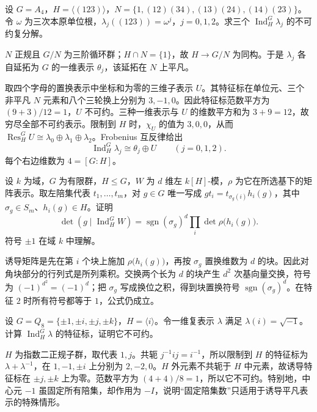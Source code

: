\begin{exercise}\label{b5:ex:03-a4-induction}
	设 \(G=A_4\)，\(H=\bigl\langle(123)\bigr\rangle\)，\(N=\bigl\{1,(12)(34),(13)(24),(14)(23)\bigr\}\)。令 \(\omega\) 为三次本原单位根，\(\lambda_j((123))=\omega^j\)，\(j=0,1,2\)。求三个 \(\operatorname{Ind}_H^G\lambda_j\) 的不可约复分解。
\end{exercise}
\begin{solution}
	\(N\) 正规且 \(G/N\) 为三阶循环群；\(H\cap N=\{1\}\)，故 \(H\rightarrow G/N\) 为同构。于是 \(\lambda_j\) 各自延拓为 \(G\) 的一维表示 \(\theta_j\)，该延拓在 \(N\) 上平凡。

	取四个字母的置换表示中坐标和为零的三维子表示 \(U\)。其特征标在单位元、三个非平凡 \(N\) 元素和八个三轮换上分别为 \(3,-1,0\)。因此特征标范数平方为 \((9+3)/12=1\)，\(U\) 不可约。三种一维表示与 \(U\) 的维数平方和为 \(3+9=12\)，故穷尽全部不可约表示。限制到 \(H\) 时，\(\chi_U\) 的值为 \(3,0,0\)，从而 \(\operatorname{Res}_H^G U\cong\lambda_0\oplus\lambda_1\oplus\lambda_2\)。Frobenius 互反律给出
	\[
		\operatorname{Ind}_H^G\lambda_j\cong\theta_j\oplus U \qquad(j=0,1,2).
	\]
	每个右边维数为 \(4=[G:H]\)。
\end{solution}

\begin{exercise}\label{b5:ex:03-induced-determinant}
	设 \(k\) 为域，\(G\) 为有限群，\(H\le G\)，\(W\) 为 \(d\) 维左 \(k[H]\)-模，\(\rho\) 为它在所选基下的矩阵表示。取左陪集代表 \(t_1,\ldots,t_m\)，对 \(g\in G\) 唯一写成 \(gt_i=t_{\sigma_g(i)}h_i(g)\)，其中 \(\sigma_g\in S_m\)、\(h_i(g)\in H\)。证明
	\[
		\det\left(g\mid\operatorname{Ind}_H^G W\right) =\operatorname{sgn}(\sigma_g)^d\prod_i\det\rho\bigl(h_i(g)\bigr).
	\]
	符号 \(\pm1\) 在域 \(k\) 中理解。
\end{exercise}
\begin{solution}
	诱导矩阵是先在第 \(i\) 个块上施加 \(\rho\bigl(h_i(g)\bigr)\)，再按 \(\sigma_g\) 置换维数为 \(d\) 的块。因此对角块部分的行列式是所列乘积。交换两个长为 \(d\) 的块产生 \(d^2\) 次基向量交换，符号为 \((-1)^{d^2}=(-1)^d\)；把 \(\sigma_g\) 写成换位之积，得到块置换符号 \(\operatorname{sgn}(\sigma_g)^d\)。在特征 \(2\) 时所有符号都等于 \(1\)，公式仍成立。
\end{solution}

\begin{exercise}\label{b5:ex:03-quaternion-induction}
	设 \(G=Q_8=\{\pm1,\pm i,\pm j,\pm k\}\)，\(H=\langle i\rangle\)。令一维复表示 \(\lambda\) 满足 \(\lambda(i)=\sqrt{-1}\)。计算 \(\operatorname{Ind}_H^G\lambda\) 的特征标，证明它不可约。
\end{exercise}
\begin{solution}
	\(H\) 为指数二正规子群，取代表 \(1,j\)。共轭 \(j^{-1}ij=i^{-1}\)，所以限制到 \(H\) 的特征标为 \(\lambda+\lambda^{-1}\)，在 \(1,-1,\pm i\) 上分别为 \(2,-2,0\)。\(H\) 外元素不共轭于 \(H\) 中元素，故诱导特征标在 \(\pm j,\pm k\) 上为零。范数平方为 \((4+4)/8=1\)，所以它不可约。特别地，中心元 \(-1\) 虽固定所有陪集，却作用为 \(-I\)，说明“固定陪集数”只适用于诱导平凡表示的特殊情形。
\end{solution}

